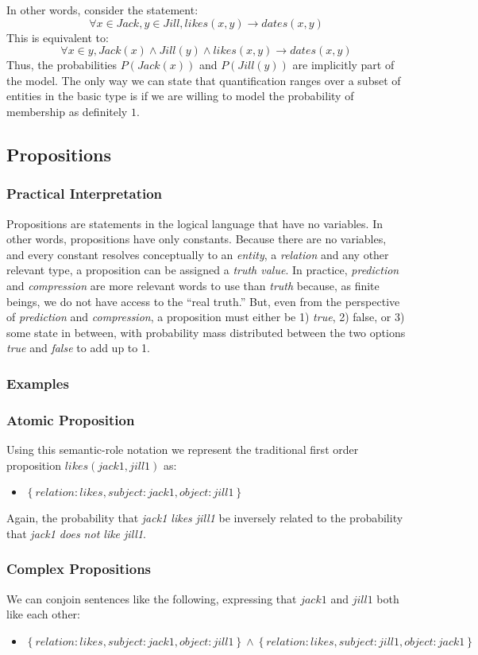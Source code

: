 \documentclass[12pt]{article}
\begin{document}
In other words, consider the statement:
\[ \forall x \in Jack, y \in Jill, likes(x, y) \rightarrow dates(x, y) \]
This is equivalent to:
\[\forall x \in  y, Jack(x) \wedge Jill(y) \wedge likes(x, y) \rightarrow dates(x, y) \]
Thus, the probabilities $P(Jack(x))$ and $P(Jill(y))$ are implicitly part of the model.
The only way we can state that quantification ranges over a subset of entities in the basic type is if we are willing to model the probability of membership as definitely $1$.

\subsection{Propositions}
\subsubsection{Practical Interpretation}
Propositions are statements in the logical language that have no variables. In other words, propositions have only constants.
Because there are no variables, and every constant resolves conceptually to an {\em entity}, a {\em relation} and any other relevant type, a proposition can be assigned a {\em truth value}.
In practice, {\em prediction} and {\em compression} are more relevant words to use than {\em truth} because, as finite beings, we do not have access to the ``real truth.''
But, even from the perspective of {\em prediction} and {\em compression}, a proposition must either be 1) {\em true}, 2) false, or 3) some state in between, with probability mass distributed between the two options {\em true} and {\em false} to add up to 1.

\subsubsection{Examples}
\subsubsection{Atomic Proposition}
Using this semantic-role notation we represent the traditional first order proposition $likes(jack1, jill1)$ as:
\begin{itemize}
    \item $\left\{relation:likes, subject:jack1, object:jill1 \right\}$
\end{itemize}
Again, the probability that {\em jack1 likes jill1} be inversely related to the probability that {\em jack1 does not like jill1}.

\subsubsection{Complex Propositions}
We can conjoin sentences like the following, expressing that $jack1$ and $jill1$ both like each other:
\begin{itemize}
    \item $\left\{relation:likes, subject:jack1, object:jill1 \right\} \wedge \left\{relation:likes, subject:jill1, object:jack1 \right\}$
\end{itemize}
\end{document}
